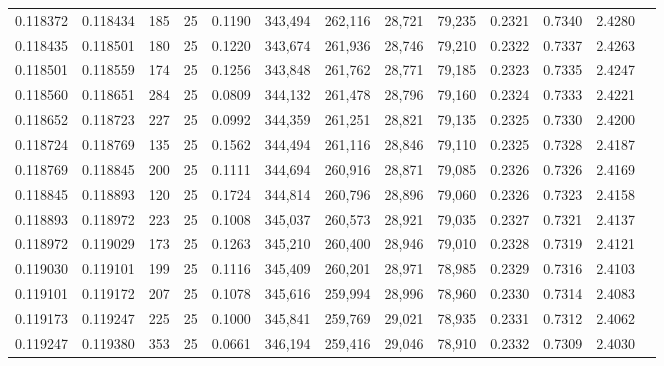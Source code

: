 \begin{tabular}{rrrrrrrrrrrrr}
0.118372 & 0.118434 &   185 &  25 &                                     0.1190 & 343,494 & 262,116 &  28,721 &  79,235 & 0.2321 & 0.7340 & 2.4280 \\
0.118435 & 0.118501 &   180 &  25 &                                     0.1220 & 343,674 & 261,936 &  28,746 &  79,210 & 0.2322 & 0.7337 & 2.4263 \\
0.118501 & 0.118559 &   174 &  25 &                                     0.1256 & 343,848 & 261,762 &  28,771 &  79,185 & 0.2323 & 0.7335 & 2.4247 \\
0.118560 & 0.118651 &   284 &  25 &                                     0.0809 & 344,132 & 261,478 &  28,796 &  79,160 & 0.2324 & 0.7333 & 2.4221 \\
0.118652 & 0.118723 &   227 &  25 &                                     0.0992 & 344,359 & 261,251 &  28,821 &  79,135 & 0.2325 & 0.7330 & 2.4200 \\
0.118724 & 0.118769 &   135 &  25 &                                     0.1562 & 344,494 & 261,116 &  28,846 &  79,110 & 0.2325 & 0.7328 & 2.4187 \\
0.118769 & 0.118845 &   200 &  25 &                                     0.1111 & 344,694 & 260,916 &  28,871 &  79,085 & 0.2326 & 0.7326 & 2.4169 \\
0.118845 & 0.118893 &   120 &  25 &                                     0.1724 & 344,814 & 260,796 &  28,896 &  79,060 & 0.2326 & 0.7323 & 2.4158 \\
0.118893 & 0.118972 &   223 &  25 &                                     0.1008 & 345,037 & 260,573 &  28,921 &  79,035 & 0.2327 & 0.7321 & 2.4137 \\
0.118972 & 0.119029 &   173 &  25 &                                     0.1263 & 345,210 & 260,400 &  28,946 &  79,010 & 0.2328 & 0.7319 & 2.4121 \\
0.119030 & 0.119101 &   199 &  25 &                                     0.1116 & 345,409 & 260,201 &  28,971 &  78,985 & 0.2329 & 0.7316 & 2.4103 \\
0.119101 & 0.119172 &   207 &  25 &                                     0.1078 & 345,616 & 259,994 &  28,996 &  78,960 & 0.2330 & 0.7314 & 2.4083 \\
0.119173 & 0.119247 &   225 &  25 &                                     0.1000 & 345,841 & 259,769 &  29,021 &  78,935 & 0.2331 & 0.7312 & 2.4062 \\
0.119247 & 0.119380 &   353 &  25 &                                     0.0661 & 346,194 & 259,416 &  29,046 &  78,910 & 0.2332 & 0.7309 & 2.4030 \\

\end{tabular}
